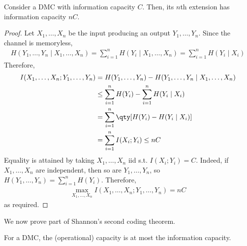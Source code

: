 \begin{lemma}
    Consider a DMC with information capacity $C$.
    Then, its $n$th extension has information capacity $nC$.
\end{lemma}

\begin{proof}
    Let $X_1, \dots, X_n$ be the input producing an output $Y_1, \dots, Y_n$.
    Since the channel is memoryless,
    \begin{align*}
        H(Y_1, \dots, Y_n \mid X_1, \dots, X_n) = \sum_{i=1}^n H(Y_i \mid X_1, \dots, X_n) = \sum_{i=1}^n H(Y_i \mid X_i)
    \end{align*}
    Therefore,
    \begin{align*}
        I(X_1, \dots, X_n; Y_1, \dots, Y_n) &= H(Y_1, \dots, Y_n) - H(Y_1, \dots, Y_n \mid X_1, \dots, X_n) \\
        &\leq \sum_{i=1}^n H(Y_i) - \sum_{i=1}^n H(Y_i \mid X_i) \\
        &= \sum_{i=1}^n \qty[H(Y_i) - H(Y_i \mid X_i)] \\
        &= \sum_{i=1}^n I(X_i;Y_i) \leq nC
    \end{align*}
    Equality is attained by taking $X_1, \dots, X_n$ iid s.t. $I(X_i;Y_i) = C$.
    Indeed, if $X_1, \dots, X_n$ are independent, then so are $Y_1, \dots, Y_n$, so $H(Y_1, \dots, Y_n) = \sum_{i=1}^n H(Y_i)$.
    Therefore,
    \begin{align*}
        \max_{X_1, \dots, X_n} I(X_1, \dots, X_n; Y_1, \dots, Y_n) = nC
    \end{align*}
    as required.
\end{proof}

We now prove part of Shannon's second coding theorem.

\begin{proposition}
    For a DMC, the (operational) capacity is at most the information capacity.
\end{proposition}

